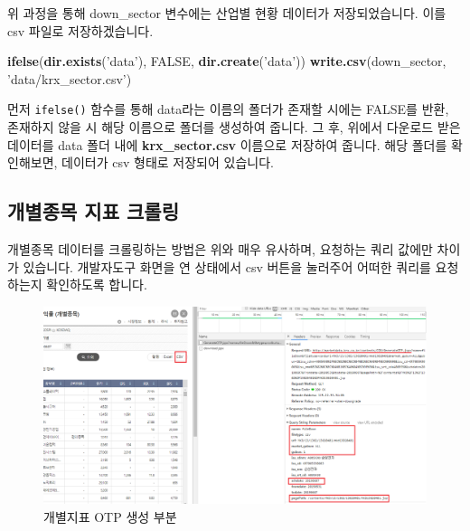 \documentclass[12pt,]{book}
\newenvironment{Shaded}{\begin{snugshade}}{\end{snugshade}}
\newcommand{\KeywordTok}[1]{\textcolor[rgb]{0.13,0.29,0.53}{\textbf{#1}}}
\newcommand{\NormalTok}[1]{#1}
\newcommand{\OtherTok}[1]{\textcolor[rgb]{0.56,0.35,0.01}{#1}}
\newcommand{\StringTok}[1]{\textcolor[rgb]{0.31,0.60,0.02}{#1}}
\begin{document}
위 과정을 통해 down\_sector 변수에는 산업별 현황 데이터가 저장되었습니다. 이를 csv 파일로 저장하겠습니다.

\begin{Shaded}
\begin{Highlighting}[]
\KeywordTok{ifelse}\NormalTok{(}\KeywordTok{dir.exists}\NormalTok{(}\StringTok{'data'}\NormalTok{), }\OtherTok{FALSE}\NormalTok{, }\KeywordTok{dir.create}\NormalTok{(}\StringTok{'data'}\NormalTok{))}
\KeywordTok{write.csv}\NormalTok{(down_sector, }\StringTok{'data/krx_sector.csv'}\NormalTok{)}
\end{Highlighting}
\end{Shaded}

먼저 \texttt{ifelse()} 함수를 통해 data라는 이름의 폴더가 존재할 시에는 FALSE를 반환, 존재하지 않을 시 해당 이름으로 폴더를 생성하여 줍니다. 그 후, 위에서 다운로드 받은 데이터를 data 폴더 내에 \textbf{krx\_sector.csv} 이름으로 저장하여 줍니다. 해당 폴더를 확인해보면, 데이터가 csv 형태로 저장되어 있습니다.

\hypertarget{section-20}{%
\subsection{개별종목 지표 크롤링}\label{section-20}}

개별종목 데이터를 크롤링하는 방법은 위와 매우 유사하며, 요청하는 쿼리 값에만 차이가 있습니다. 개발자도구 화면을 연 상태에서 csv 버튼을 눌러주어 어떠한 쿼리를 요청하는지 확인하도록 합니다.

\begin{figure}[h]

{\centering \includegraphics[width=1\linewidth]{images/crawl_practice_krx_ind} 

}

\caption{개별지표 OTP 생성 부분}\label{fig:unnamed-chunk-8}
\end{figure}
\end{document}
